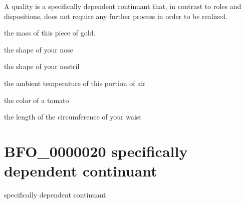 \documentclass[letterpaper,10pt,english]{sphinxmanual}
\begin{document}
\begin{sphinxShadowBox}

\sphinxAtStartPar
A quality is a specifically dependent continuant that, in contrast to roles and dispositions, does not require any further process in order to be realized.
\end{sphinxShadowBox}

\begin{sphinxShadowBox}

\sphinxAtStartPar
the mass of this piece of gold.

\sphinxAtStartPar
the shape of your nose

\sphinxAtStartPar
the shape of your nostril

\sphinxAtStartPar
the ambient temperature of this portion of air

\sphinxAtStartPar
the color of a tomato

\sphinxAtStartPar
the length of the circumference of your waist
\end{sphinxShadowBox}

\begin{sphinxShadowBox}

\sphinxAtStartPar
{}
\end{sphinxShadowBox}
\begin{quote}
\label{\detokenize{doc-BFO_0000020:bfo-0000020}}\label{\detokenize{doc-BFO_0000020:specifically-dependent-continuant}}\label{\detokenize{doc-BFO_0000020:bfo-0000020}}
\ignorespaces \end{quote}


\section{BFO\_0000020 \sphinxhyphen{} specifically dependent continuant}
\label{\detokenize{doc-BFO_0000020:bfo-0000020-specifically-dependent-continuant}}\label{\detokenize{doc-BFO_0000020:index-0}}\label{\detokenize{doc-BFO_0000020::doc}}
\begin{sphinxShadowBox}

\sphinxAtStartPar
specifically dependent continuant
\end{sphinxShadowBox}
\end{document}
